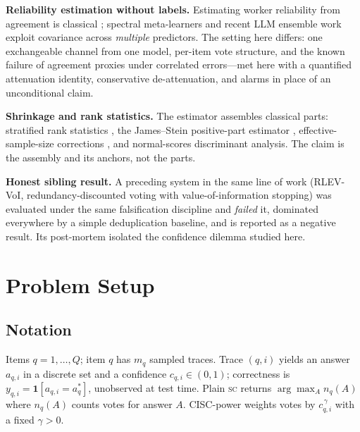 \documentclass[twoside,11pt]{article}
\newcommand{\SC}{\textsc{sc}}
\begin{document}
\textbf{Reliability estimation without labels.} Estimating worker reliability from agreement is classical \citep{dawid1979maximum,whitehill2009whose,karger2011iterative}; spectral meta-learners \citep{parisi2014ranking} and recent LLM ensemble work \citep{fuse2026,beyondmajority2025} exploit covariance across \emph{multiple} predictors. The setting here differs: one exchangeable channel from one model, per-item vote structure, and the known failure of agreement proxies under correlated errors---met here with a quantified attenuation identity, conservative de-attenuation, and alarms in place of an unconditional claim.

\textbf{Shrinkage and rank statistics.} The estimator assembles classical parts: stratified rank statistics \citep{vanelteren1960}, the James--Stein positive-part estimator \citep{james1961estimation}, effective-sample-size corrections \citep{kish1965,rao1981analysis}, and normal-scores discriminant analysis. The claim is the assembly and its anchors, not the parts.

\textbf{Honest sibling result.} A preceding system in the same line of work
(RLEV-VoI, redundancy-discounted voting with value-of-information stopping)
was evaluated under the same falsification discipline and \emph{failed} it,
dominated everywhere by a simple deduplication baseline, and is reported as a
negative result. Its post-mortem isolated the confidence dilemma studied
here.%


\section{Problem Setup}\label{sec:setup}

\subsection{Notation}
Items $q=1,\dots,Q$; item $q$ has $m_q$ sampled traces. Trace $(q,i)$ yields an answer $a_{q,i}$ in a discrete set and a confidence $c_{q,i}\in(0,1)$; correctness is $y_{q,i}=\mathbf{1}[a_{q,i}=a_q^\ast]$, unobserved at test time. Plain \SC{} returns $\arg\max_A n_q(A)$ where $n_q(A)$ counts votes for answer $A$. CISC-power weights votes by $c_{q,i}^{\,\gamma}$ with a fixed $\gamma>0$.
\end{document}
